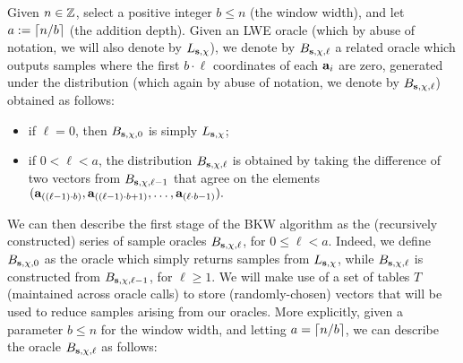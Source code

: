 Given $n \in \mathbb{Z}$, select a positive integer $b\leq n$ (the window width), and let $a:= \lceil n/b \rceil$ (the addition depth).
Given an LWE oracle (which by abuse of notation, we will also denote by $L_{\mathbf{s},\chi}$), we denote by ${B_{\mathbf{s},\chi,\ell}}$ a related oracle which outputs samples where the first $b \cdot \ell$ coordinates of each $\mathbf{a}_i$ are zero, generated under the distribution (which again by abuse of notation, we denote by ${B_{\mathbf{s},\chi,\ell}}$) obtained as follows: 
\begin{itemize}
\item if $\ell=0$, then $B_{\mathbf{s},\chi,0}$ is simply $L_{\mathbf{s},\chi}$;
\item if $0<\ell<a$, the distribution $B_{\mathbf{s},\chi,\ell}$ is obtained by taking the difference of two vectors from $B_{\mathbf{s},\chi,\ell-1}$ that agree on the elements 
$(\mathbf{a}_{((\ell-1)\cdot b)},\mathbf{a}_{((\ell-1)\cdot b+1)},\ldots,\mathbf{a}_{(\ell\cdot b-1)}).$
\end{itemize}
We can then describe the first stage of the BKW algorithm as the (recursively constructed) series of sample oracles ${B_{\mathbf{s},\chi,\ell}}$, for $0 \leq \ell <  a$. Indeed, we define ${B_{\mathbf{s},\chi,0}}$ as the oracle which simply returns samples from $L_{\mathbf{s},\chi}$, while ${B_{\mathbf{s},\chi,\ell}}$ is constructed from ${B_{\mathbf{s},\chi,\ell-1}}$, for $\ell \geq 1$. We will make use of a set of tables $T$ (maintained across oracle calls) to store (randomly-chosen) vectors that will be used to reduce samples arising from our oracles. 
More explicitly, given a parameter $b \leq n$ for the window width, and letting $a = \lceil n/b \rceil$, we can describe the oracle ${B_{\mathbf{s},\chi,\ell}}$ as  follows:
